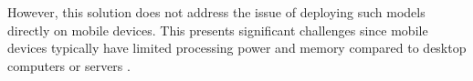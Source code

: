 \documentclass[licencjacka,en]{pracamgr}
\begin{document}
However, this solution does not address the issue of deploying such models directly on mobile devices. This presents significant challenges since mobile devices typically have limited processing power and memory compared to desktop computers or servers \cite{mobile_resources}. 




 
\end{document}

